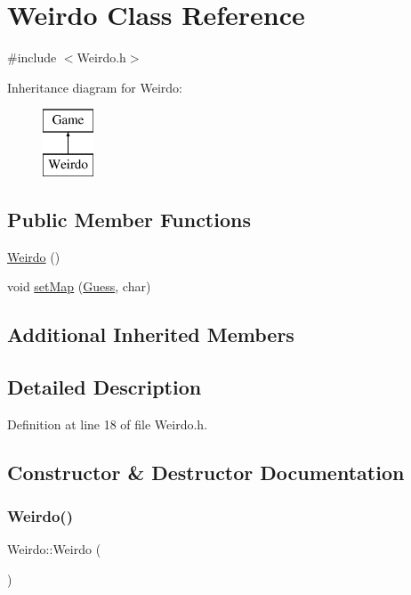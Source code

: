 \hypertarget{class_weirdo}{}\section{Weirdo Class Reference}
\label{class_weirdo}


{\ttfamily \#include $<$Weirdo.\+h$>$}

Inheritance diagram for Weirdo\+:\begin{figure}[H]
\begin{center}
\leavevmode
\includegraphics[height=2.000000cm]{class_weirdo}
\end{center}
\end{figure}
\subsection*{Public Member Functions}
\begin{DoxyCompactItemize}
\item 
\hyperlink{class_weirdo_aa4da5eda496d8a5bdfa0bd2e1f4dc582}{Weirdo} ()
\item 
void \hyperlink{class_weirdo_aa71d633becb93a3d1b6273f5b0a8dc14}{set\+Map} (\hyperlink{class_guess}{Guess}, char)
\end{DoxyCompactItemize}
\subsection*{Additional Inherited Members}


\subsection{Detailed Description}


Definition at line 18 of file Weirdo.\+h.



\subsection{Constructor \& Destructor Documentation}
\mbox{\label{class_weirdo_aa4da5eda496d8a5bdfa0bd2e1f4dc582}} 
\subsubsection{\texorpdfstring{Weirdo()}{Weirdo()}}
{\footnotesize\ttfamily Weirdo\+::\+Weirdo (\begin{DoxyParamCaption}{ }\end{DoxyParamCaption})\hspace{0.3cm}{\ttfamily [inline]}}



